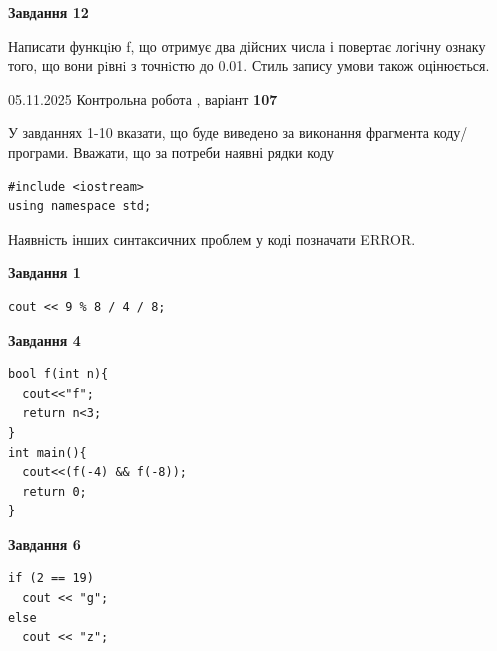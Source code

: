 \documentclass[12pt, ukrainian]{article}
\begin{document}
{\begin {large}
\begin{minipage}[t]{11.0cm}
\begin{center}
\textbf{Завдання 12}
\end{center}

Написати функцiю f, що отримує два дійсних числа і повертає логічну ознаку того, що вони рiвнi з точнiстю до 0.01. Стиль запису умови також оцінюється.\par

\end{minipage}

\end {large}}
\newpage

{\Large{05.11.2025 Контрольна робота , варіант  \No \textbf { 107 }\par}}
{
\begin {large}
У завданнях 1-10 вказати, що буде виведено за виконання фрагмента коду/про\-гра\-ми.
Вважати, що за потреби наявні рядки коду
\begin{verbatim}
#include <iostream>
using namespace std;
\end{verbatim}
Наявність інших синтаксичних проблем у коді позначати ERROR.

\begin{minipage}[t]{7.0cm}

\begin{center}
\textbf{Завдання 1}
\end{center}
\vspace{-8mm}

\begin{verbatim}
cout << 9 % 8 / 4 / 8;
\end{verbatim}



\begin{center}
\textbf{Завдання 4}
\end{center}
\vspace{-8mm}

\begin{verbatim}
bool f(int n){
  cout<<"f";
  return n<3;
}
int main(){
  cout<<(f(-4) && f(-8));
  return 0;
}
\end{verbatim}



\begin{center}
\textbf{Завдання 6}
\end{center}
\vspace{-8mm}

\begin{verbatim}
if (2 == 19)
  cout << "g";
else
  cout << "z";
\end{verbatim}




\end{minipage}
\end{large}}
\end{document}
